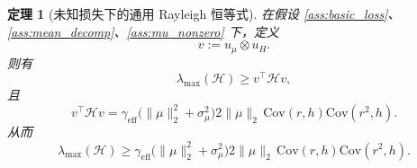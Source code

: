 \documentclass[11pt]{ctexart}
\newtheorem{theorem}{定理}
\begin{document}
\begin{theorem}[未知损失下的通用 Rayleigh 恒等式]\label{thm:generic_exact_identity}
在假设 \ref{ass:basic_loss}、\ref{ass:mean_decomp}、\ref{ass:mu_nonzero} 下，定义
\[
v := u_\mu \otimes u_H.
\]
则有
\[
\lambda_{\max}(\mathcal{H}) \ge v^\top \mathcal{H} v,
\]
且
\begin{equation}\label{eq:generic_exact_identity}
v^\top \mathcal{H} v
= \gamma_{\mathrm{eff}}\big(\|\mu\|_2^2 + \sigma_\mu^2\big)
 2\|\mu\|_2 \,\mathrm{Cov}(r,h)
 \mathrm{Cov}(r^2,h).
\end{equation}
从而
\begin{equation}\label{eq:generic_exact_rayleigh_lower}
\lambda_{\max}(\mathcal{H})
\ge
\gamma_{\mathrm{eff}}\big(\|\mu\|_2^2 + \sigma_\mu^2\big)
 2\|\mu\|_2 \,\mathrm{Cov}(r,h)
 \mathrm{Cov}(r^2,h).
\end{equation}
\end{theorem}
\end{document}
